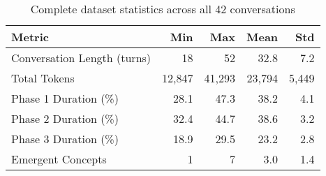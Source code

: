 \documentclass{article}
\begin{document}
\begin{table}[h]
\centering
\begin{tabular}{lrrrr}
\toprule
\textbf{Metric} & \textbf{Min} & \textbf{Max} & \textbf{Mean} & \textbf{Std} \\
\midrule
Conversation Length (turns) & 18 & 52 & 32.8 & 7.2 \\
Total Tokens & 12,847 & 41,293 & 23,794 & 5,449 \\
Phase 1 Duration (\%) & 28.1 & 47.3 & 38.2 & 4.1 \\
Phase 2 Duration (\%) & 32.4 & 44.7 & 38.6 & 3.2 \\
Phase 3 Duration (\%) & 18.9 & 29.5 & 23.2 & 2.8 \\
Emergent Concepts & 1 & 7 & 3.0 & 1.4 \\
\bottomrule
\end{tabular}
\caption{Complete dataset statistics across all 42 conversations}
\label{tab:complete_stats}
\end{table}
\end{document}
